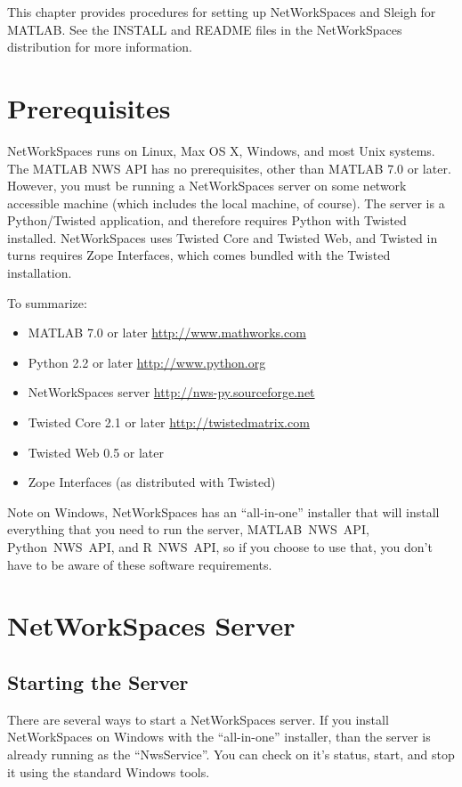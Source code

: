 This chapter provides procedures for setting up NetWorkSpaces
and Sleigh for MATLAB.  See the INSTALL and README files in the
NetWorkSpaces distribution for more information.

\section{Prerequisites}
NetWorkSpaces runs on Linux, Max OS X, Windows, and most Unix systems.
The MATLAB NWS API has no prerequisites, other than MATLAB 7.0 or later.
However, you must be running a NetWorkSpaces server on some network
accessible machine (which includes the local machine, of course).  The
server is a Python/Twisted application, and therefore requires Python
with Twisted installed.  NetWorkSpaces uses Twisted Core and Twisted
Web, and Twisted in turns requires Zope Interfaces, which comes bundled
with the Twisted installation.

To summarize:
\begin{itemize}
\item MATLAB 7.0 or later \url{http://www.mathworks.com}
\item Python 2.2 or later \url{http://www.python.org}
\item NetWorkSpaces server \url{http://nws-py.sourceforge.net}
\item Twisted Core 2.1 or later \url{http://twistedmatrix.com}
\item Twisted Web 0.5 or later
\item Zope Interfaces (as distributed with Twisted)
\end{itemize}

Note on Windows, NetWorkSpaces has an ``all-in-one'' installer that will
install everything that you need to run the server, MATLAB~NWS~API,
Python~NWS~API, and R~NWS~API, so if you choose to use that, you don't
have to be aware of these software requirements.

\section{NetWorkSpaces Server}
\subsection{Starting the Server}
There are several ways to start a NetWorkSpaces server.
If you install NetWorkSpaces on Windows with the ``all-in-one''
installer, than the server is already running as the
``NwsService''.  You can check on it's status, start, and stop it using
the standard Windows tools.

